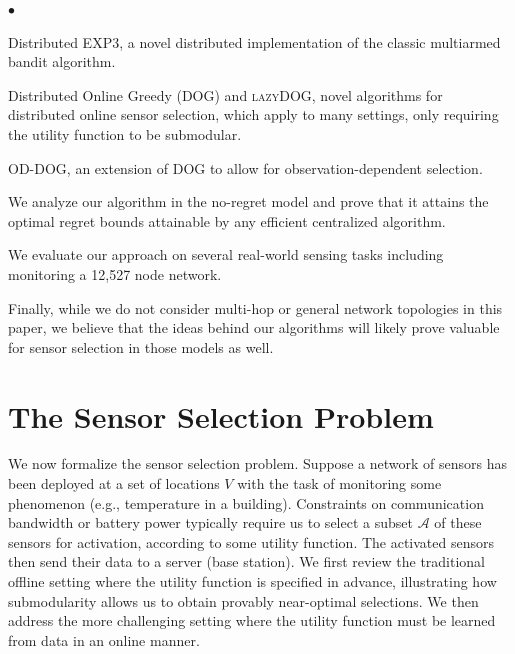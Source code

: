 \documentclass{sig-alternate-dan}
\numberwithin{equation}{section}
\newcommand{\algofont}[1]{\textsc{#1}}
\newcommand{\EXPthree}{{\algofont{EXP3}}\xspace}
\newcommand{\oddog}{\algofont{OD-DOG}\xspace}
\newcommand{\dog}{\algofont{DOG}\xspace}
\newcommand{\lazydog}{\algofont{lazyDOG}\xspace}
\newcommand{\sensors}{V}
\newcommand{\initOneLiners}{%
    \setlength{\itemsep}{0pt}
    \setlength{\parsep }{0pt}
    \setlength{\topsep }{0pt}
%
}
\newenvironment{OneLiners}[1][\ensuremath{\bullet}]
    {\begin{list}
        {#1}
        {\initOneLiners}}
    {\end{list}}
\renewcommand{\paragraph}[1]{\vspace{3mm}\noindent{\bf #1.} }
\newcommand{\cA}{{\mathcal{A}}}
\begin{document}
\paragraph{Our main contributions}
%
\begin{OneLiners}
\item Distributed \EXPthree, a novel distributed implementation of the
  classic multiarmed bandit algorithm.
\item Distributed Online Greedy (\dog) and \lazydog, novel algorithms for
  distributed online sensor selection, which apply to many settings,
  only requiring the utility function to be submodular.
\item \oddog, an extension of \dog to allow for
  observation-dependent selection.
\item We analyze our algorithm in the no-regret model and prove that
  it attains the optimal regret bounds attainable by any efficient
  centralized algorithm.
\item We evaluate our approach on several real-world sensing tasks including monitoring a 12,527 node network. 
\end{OneLiners}

\vspace{1em}
Finally, while we do not consider multi-hop or general
network topologies in this paper, 
we believe that the ideas behind our algorithms will likely prove
valuable for sensor selection in those models as well.


%
%
%
%
%
%

%
%
%
%
%

%


\section{The Sensor Selection Problem} \label{sec:problem}
We now formalize the sensor selection problem.  Suppose a network of
sensors has been deployed at a set of locations $\sensors$ with the
task of monitoring some phenomenon (e.g., temperature in a
building). 
%
%
Constraints on communication bandwidth or battery power typically
require us to select a subset $\cA$ of these sensors for activation,
according to some utility function.  The activated sensors then send
their data to a server (base station).  We first review the
traditional offline setting where the utility function is specified in
advance, illustrating how submodularity allows us to obtain provably near-optimal selections.
We then address the more challenging setting where the utility
function must be learned from data in an online manner.
\end{document}
